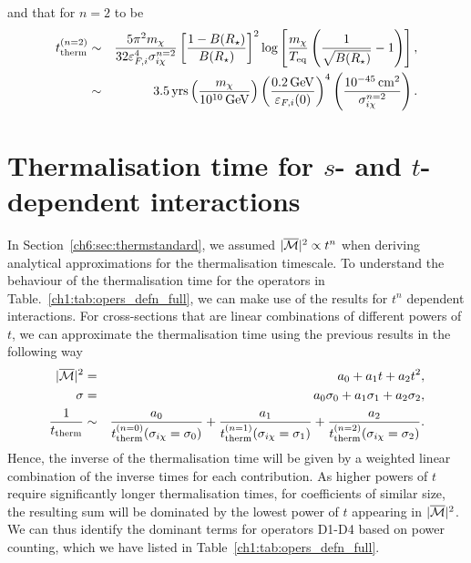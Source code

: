 and that for $n=2$ to be
\begin{eqnarray}
    t_{\rm therm}^{(n=2)} &\sim& \frac{5 \pi^2 m_\chi}{ 32 \varepsilon_{F,i}^4\sigma_{i\chi}^{n=2}} \left[\frac{1-B(R_\star)}{B(R_\star)}\right]^2 \log\left[\frac{m_\chi}{T_{\rm eq}}\left(\frac{1}{\sqrt{B(R_\star)}}-1\right)\right],\\
    &\sim& 3.5 {\rm \,yrs} \left( \frac{m_\chi}{10^{10} {\rm \,GeV}}\right) \left(\frac{0.2{\rm \,GeV}}{\varepsilon_{F,i}(0)}\right)^{4}\left(\frac{10^{-45}{\rm \,cm}^2}{\sigma_{i\chi}^{n=2}}\right). 
\end{eqnarray}







\section[Thermalisation time for {\it s}- and {\it t}-dependent interactions]{Thermalisation time for $s$- and $t$-dependent interactions}
\label{app:sec:sdeptherm}


In Section~\ref{ch6:sec:thermstandard}, we assumed $|\overline{\mathcal M}|^2\propto t^n$ when deriving analytical approximations for the thermalisation timescale. To understand the behaviour of the thermalisation time for the operators in Table.~\ref{ch1:tab:opers_defn_full}, we can make use of the results for $t^n$ dependent interactions. For cross-sections that are linear combinations of different powers of $t$, we can approximate the thermalisation time using the previous results in the following way
\begin{eqnarray}
|\overline{\mathcal M}|^2 &=& a_0 + a_1 t + a_2 t^2,\\
\sigma &=& a_0\sigma_0 + a_1 \sigma_1 + a_2 \sigma_2,\\
\frac{1}{t_{\rm therm}} &\sim& \frac{a_0}{ t_{\rm therm}^{(n=0)}(\sigma_{i\chi}=\sigma_0)} + \frac{a_1} {t_{\rm therm}^{(n=1)}(\sigma_{i\chi}=\sigma_1)} 
 + \frac{a_2}{  t_{\rm therm}^{(n=2)}(\sigma_{i\chi}=\sigma_2)}. 
\label{app:eq:ttherm_weighted}
\end{eqnarray}
Hence, the inverse of the thermalisation time will be given by a weighted linear combination of the inverse times for each contribution. As higher powers of $t$ require significantly longer thermalisation times, for coefficients of similar size, the resulting sum will be dominated by the lowest power of $t$ appearing in  $|\overline{\mathcal M}|^2$.  We can thus identify the dominant terms for operators D1-D4  based on power counting, which we have listed in Table~\ref{ch1:tab:opers_defn_full}.

